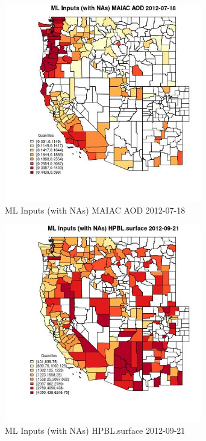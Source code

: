 \begin{figure} 
\centering  
\includegraphics[width=0.77\textwidth]{Code_Outputs/Report_ML_input_PM25_Step4_part_e_de_duplicated_aves_compiled_2019-05-14wNAs_CountyMAIAC_AODMean2012-07-18_2012-07-18.jpg} 
\caption{\label{fig:Report_ML_input_PM25_Step4_part_e_de_duplicated_aves_compiled_2019-05-14wNAsCountyMAIAC_AODMean2012-07-18_2012-07-18}ML Inputs (with NAs) MAIAC AOD 2012-07-18} 
\end{figure} 
 

\begin{figure} 
\centering  
\includegraphics[width=0.77\textwidth]{Code_Outputs/Report_ML_input_PM25_Step4_part_e_de_duplicated_aves_compiled_2019-05-14wNAs_CountyHPBLsurfaceMean2012-09-21_2012-09-21.jpg} 
\caption{\label{fig:Report_ML_input_PM25_Step4_part_e_de_duplicated_aves_compiled_2019-05-14wNAsCountyHPBLsurfaceMean2012-09-21_2012-09-21}ML Inputs (with NAs) HPBL.surface 2012-09-21} 
\end{figure} 
 

